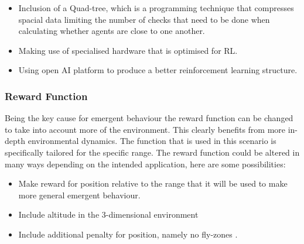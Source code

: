 \begin{itemize}
    \item 
    Inclusion of a Quad-tree\cite{ref1}, which is a programming technique that compresses spacial data limiting the number of checks that need to be done when calculating whether agents are close to one another.
    \item
    Making use of specialised hardware that is optimised for RL\cite{ref2}.
    \item
    Using open AI platform to produce a better reinforcement learning structure.\cite{AI}
\end{itemize}



\subsubsection{Reward Function}
Being the key cause for emergent behaviour the reward function can be changed to take into account more of the environment. This clearly benefits from more in-depth environmental dynamics. The function that is used in this scenario is specifically tailored for the specific range. The reward function could be altered in many ways depending on the intended application, here are some possibilities:

\begin{itemize}
    \item 
    Make reward for position relative to the range that it will be used to make more general emergent behaviour.
    
    \item
    Include altitude in the 3-dimensional environment
    
    \item Include additional penalty for position, namely no fly-zones \cite{res1}.
\end{itemize}

